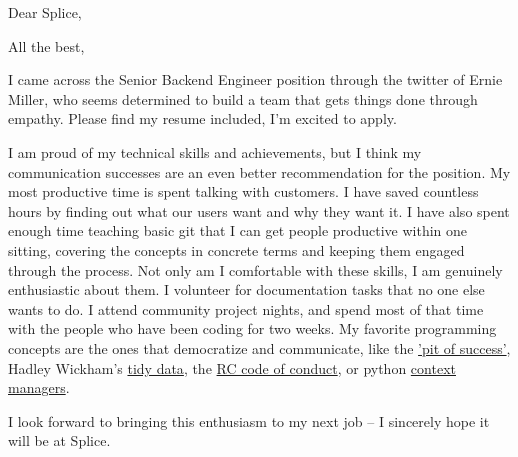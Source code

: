 \documentclass[11pt,a4paper,sans]{moderncv}        %
\begin{document}
\recipient{~}{~}
\date{\today}
\opening{Dear Splice,}
\closing{All the best,}
\makelettertitle

I came across the Senior Backend Engineer position through the twitter of Ernie Miller, who seems determined to build a team that gets things done through empathy.
Please find my resume included, I'm excited to apply.

I am proud of my technical skills and achievements, but I think my communication successes are an even better recommendation for the position.
My most productive time is spent talking with customers.
I have saved countless hours by finding out what our users want and why they want it.
I have also spent enough time teaching basic git that I can get people productive within one sitting, covering the concepts in concrete terms and keeping them engaged through the process.
Not only am I comfortable with these skills, I am genuinely enthusiastic about them.
I volunteer for documentation tasks that no one else wants to do.
I attend community project nights, and spend most of that time with the people who have been coding for two weeks.
My favorite programming concepts are the ones that democratize and communicate, like the \textcolor{cyan}{\href{https://blog.codinghorror.com/falling-into-the-pit-of-success/}{'pit of success'}}, Hadley Wickham's \textcolor{cyan}{\href{https://cran.r-project.org/web/packages/tidyverse/vignettes/manifesto.html}{tidy data}}, the \textcolor{cyan}{\href{https://www.recurse.com/code-of-conduct}{RC code of conduct}}, or python \textcolor{cyan}{\href{http://arnavk.com/posts/python-context-managers/}{context managers}}.

I look forward to bringing this enthusiasm to my next job -- I sincerely hope it will be at Splice.

\makeletterclosing
\end{document}
